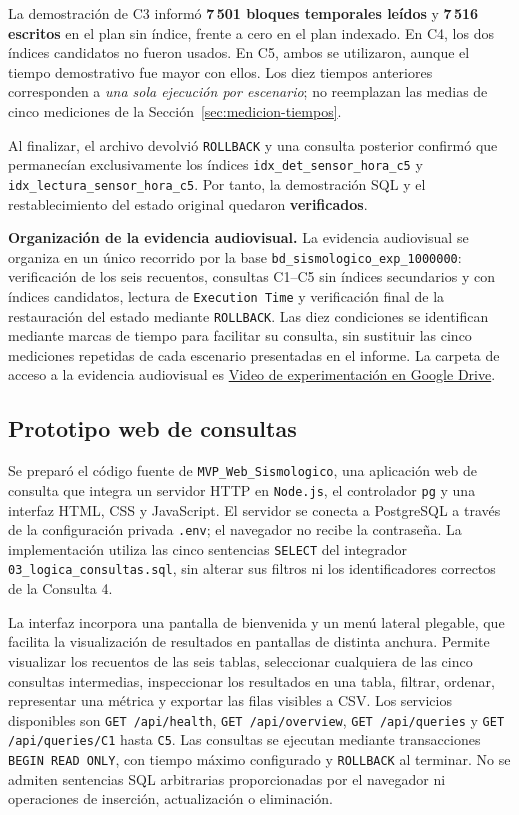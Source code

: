 \documentclass[12pt,a4paper]{article}
\begin{document}
La demostración de C3 informó \textbf{7\,501 bloques temporales leídos}
y \textbf{7\,516 escritos} en el plan sin índice, frente a cero en
el plan indexado. En C4, los dos índices candidatos no fueron usados.
En C5, ambos se utilizaron, aunque el tiempo demostrativo fue mayor
con ellos. Los diez tiempos anteriores corresponden a \emph{una
sola ejecución por escenario}; no reemplazan las medias de cinco
mediciones de la Sección~\ref{sec:medicion-tiempos}.

Al finalizar, el archivo devolvió \texttt{ROLLBACK} y una consulta
posterior confirmó que permanecían exclusivamente los índices
\nolinkurl{idx_det_sensor_hora_c5} y
\nolinkurl{idx_lectura_sensor_hora_c5}. Por tanto, la demostración
SQL y el restablecimiento del estado original quedaron \textbf{verificados}.


\medskip
\noindent\textbf{Organización de la evidencia audiovisual.}
La evidencia audiovisual se organiza en un único recorrido por la base
\nolinkurl{bd_sismologico_exp_1000000}: verificación de los seis recuentos,
consultas C1--C5 sin índices secundarios y con índices candidatos, lectura de
\texttt{Execution Time} y verificación final de la restauración del estado
mediante \texttt{ROLLBACK}. Las diez condiciones se identifican mediante
marcas de tiempo para facilitar su consulta, sin sustituir las cinco
mediciones repetidas de cada escenario presentadas en el informe.
La carpeta de acceso a la evidencia audiovisual es
\href{https://drive.google.com/drive/folders/1gb3Di7rx0eWwd05cC3xbw3DJxhjgS2t4?usp=sharing}{Video de experimentación en Google Drive}.

\Needspace{0.26\textheight}
\subsection{Prototipo web de consultas}
\label{sec:anexo-mvp-web}

Se preparó el código fuente de \nolinkurl{MVP_Web_Sismologico},
una aplicación web de consulta que integra un servidor HTTP en
\texttt{Node.js}, el controlador \texttt{pg} y una interfaz HTML,
CSS y JavaScript. El servidor se conecta a PostgreSQL a través
de la configuración privada \texttt{.env}; el navegador no recibe
la contraseña. La implementación utiliza las cinco sentencias
\texttt{SELECT} del integrador \texttt{03\_logica\_consultas.sql}, sin alterar
sus filtros ni los identificadores correctos de la Consulta 4.

La interfaz incorpora una pantalla de bienvenida y un menú lateral plegable, que facilita la visualización de resultados en pantallas de distinta anchura. Permite visualizar los recuentos de las seis tablas,
seleccionar cualquiera de las cinco consultas intermedias,
inspeccionar los resultados en una tabla, filtrar, ordenar,
representar una métrica y exportar las filas visibles a CSV.
Los servicios disponibles son
\texttt{GET /api/health}, \texttt{GET /api/overview},
\texttt{GET /api/queries} y
\texttt{GET /api/queries/C1} hasta \texttt{C5}.
Las consultas se ejecutan mediante transacciones
\texttt{BEGIN READ ONLY}, con tiempo máximo configurado y
\texttt{ROLLBACK} al terminar. No se admiten sentencias SQL
arbitrarias proporcionadas por el navegador ni operaciones
de inserción, actualización o eliminación.
\end{document}
